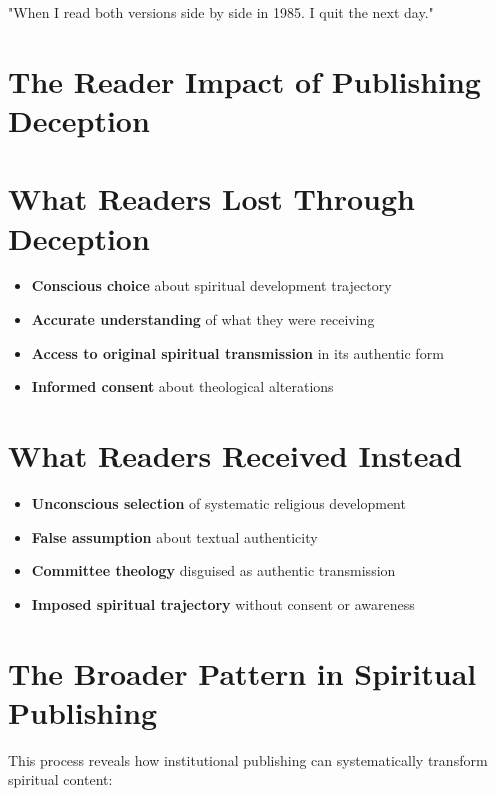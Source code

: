 \documentclass[11pt,twoside]{book}
\begin{document}
"When I read both versions side by side in 1985. I quit the next day."
\section*{The Reader Impact of Publishing Deception}
\label{sec:orga6156f5}

\section*{What Readers Lost Through Deception}
\label{sec:org56b66a4}
\begin{itemize}
\item \textbf{\textbf{Conscious choice}} about spiritual development trajectory
\item \textbf{\textbf{Accurate understanding}} of what they were receiving
\item \textbf{\textbf{Access to original spiritual transmission}} in its authentic form
\item \textbf{\textbf{Informed consent}} about theological alterations
\end{itemize}
\section*{What Readers Received Instead}
\label{sec:org318a9ed}
\begin{itemize}
\item \textbf{\textbf{Unconscious selection}} of systematic religious development
\item \textbf{\textbf{False assumption}} about textual authenticity
\item \textbf{\textbf{Committee theology}} disguised as authentic transmission
\item \textbf{\textbf{Imposed spiritual trajectory}} without consent or awareness
\end{itemize}
\section*{The Broader Pattern in Spiritual Publishing}
\label{sec:orgc4c0be2}

This process reveals how institutional publishing can systematically transform spiritual content:
\end{document}
